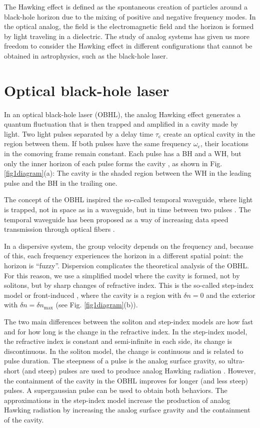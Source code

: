 \documentclass[aps,pra,reprint,amsmath,amssymb,showpacs,groupedaddress,floatfix]{revtex4-1}
\begin{document}
The Hawking effect is defined as the spontaneous creation of particles around a black-hole horizon due to the mixing of positive and negative frequency modes. In the optical analog, the field is the electromagnetic field and the horizon is formed by light traveling in a dielectric. The study of analog systems has given us more freedom to consider the Hawking effect in different configurations that cannot be obtained in astrophysics, such as the black-hole laser.

\section{Optical black-hole laser}\label{sec3obhl}
In an optical black-hole laser (OBHL), the analog Hawking effect generates a quantum fluctuation that is then trapped and amplified in a cavity made by light. Two light pulses separated by a delay time $\tau_\text{c}$ create an optical cavity in the region between them. If both pulses have the same frequency $\omega_\text{c}$, their locations in the comoving frame remain constant. Each pulse has a BH and a WH, but only the inner horizon of each pulse forms the cavity \cite{GaonaReyes2017,philbin2008fiber}, as shown in Fig. \ref{fig1diagram}(a): The cavity is the shaded region between the WH in the leading pulse and the BH in the trailing one.

The concept of the OBHL inspired the so-called temporal waveguide, where light is trapped, not in space as in a waveguide, but in time between two pulses \cite{Plansinis2016}. The temporal waveguide has been proposed as a way of increasing data speed transmission through optical fibers \cite{Demircan2011}.

In a dispersive system, the group velocity depends on the frequency and, because of this, each frequency experiences the horizon in a different spatial point: the horizon is ``fuzzy''. Dispersion complicates the theoretical analysis of the OBHL. For this reason, we use a simplified model where the cavity is formed, not by solitons, but by sharp changes of refractive index. This is the so-called step-index model \cite{Jacquet2015} or front-induced \cite{jacquet2019analytical}, where the cavity is a region with $\delta n=0$ and the exterior with $\delta n=\delta n_\text{max}$ (see Fig. \ref{fig1diagram}(b)).

The two main differences between the soliton and step-index models are how fast and for how long is the change in the refractive index. In the step-index model, the refractive index is constant and semi-infinite in each side, its change is discontinuous. In the soliton model, the change is continuous and is related to pulse duration. The steepness of a pulse is the analog surface gravity, so ultra-short (and steep) pulses are used to produce analog Hawking radiation \cite{drori2019observation}. However, the containment of the cavity in the OBHL improves for longer (and less steep) pulses. A supergaussian pulse can be used to obtain both behaviors. The approximations in the step-index model increase the production of analog Hawking radiation by increasing the analog surface gravity and the containment of the cavity.
\end{document}
